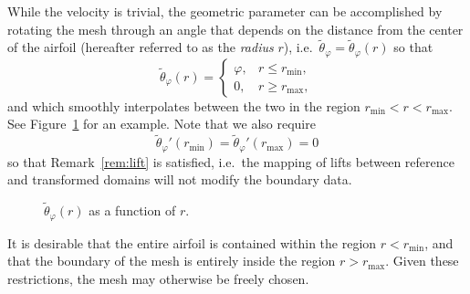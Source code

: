 \documentclass[onecolumn, twoside, a4paper, 11pt]{article}
\begin{document}
While the velocity is trivial, the geometric
parameter can be accomplished by rotating the mesh through an angle that depends
on the distance from the center of the airfoil (hereafter referred to as the
\emph{radius} $r$), i.e.~$\tilde{\theta}_\varphi = \tilde{\theta}_\varphi(r)$
so that
\[
  \tilde{\theta}_\varphi(r) = \begin{cases}
    \varphi, & r \le r_\text{min}, \\
    0, & r \ge r_\text{max},
  \end{cases}
\]
and which smoothly interpolates between the two in the region
$r_\text{min} < r < r_\text{max}$. See Figure~\ref{fig:thetatilde} for an
example. Note that we also require
\[
  \tilde{\theta}_\varphi'(r_\text{min}) =
  \tilde{\theta}_\varphi'(r_\text{max}) = 0
\]
so that Remark~\ref{rem:lift} is satisfied, i.e.~the mapping of lifts between reference and
transformed domains will not modify the boundary data.

\begin{figure}
  \begin{center}
  \end{center}
  \caption{$\tilde{\theta}_\varphi(r)$ as a function of $r$.}
  \label{fig:thetatilde}
\end{figure}

It is desirable that the entire airfoil is contained within the region $r <
r_\text{min}$, and that the boundary of the mesh is entirely inside the region
$r > r_\text{max}$. Given these restrictions, the mesh may otherwise be freely
chosen.
\end{document}
